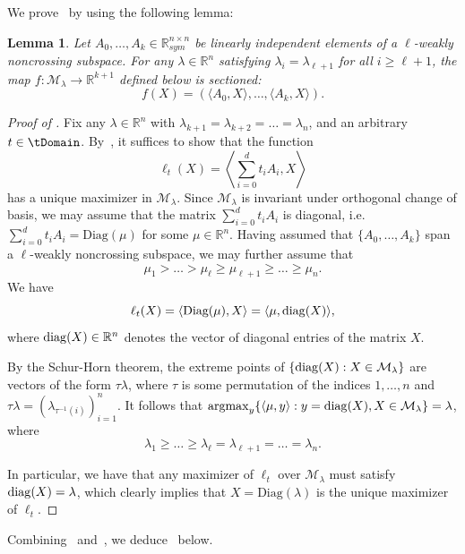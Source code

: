 \documentclass{article}
\numberwithin{equation}{section}
\newcommand{\diag}{{\rm diag}}
\newcommand{\R}{\mathbb{R}}
\newcommand{\Diag}{\text{Diag}}
\newcommand{\argmax}{\operatornamewithlimits{argmax}}
\newtheorem{lemma}{Lemma}[section]
\newcommand{\cM}{{\mathcal{M}}}
\begin{document}
We prove~ by using the following lemma: 
\begin{lemma}
    \label{lem:noncrossing}
    Let $A_0, \dots, A_k \in \R^{n\times n}_{sym}$ be linearly independent elements of a $\ell$-weakly noncrossing subspace. For any $\lambda \in \R^n$ satisfying $\lambda_i = \lambda_{\ell+1}$ for all $i \ge \ell+1$, the map $f:\cM_{\lambda} \rightarrow \R^{k+1}$ defined below is sectioned: 
    \[
        f(X) = (\langle A_0, X\rangle, \dots, \langle A_k, X\rangle).
    \]
\end{lemma}
\begin{proof}[Proof of ]
\newcommand{\At}{A(t)}
Fix any $\lambda \in \R^n$ with $\lambda_{k+1} = \lambda_{k+2} = \dots = \lambda_n$, and an arbitrary $t \in \tDomain $.
By~, it suffices to show that the function 
\[
    \ell_t(X) 
    = \left\langle\sum_{i=0}^{d} t_iA_i, X\right\rangle
\]
has a unique maximizer in $\cM_{\lambda}$.
Since $\cM_{\lambda}$ is invariant under orthogonal change of basis, we may assume that the matrix $\sum_{i=0}^{d} t_iA_i$ is diagonal, i.e. $\sum_{i=0}^{d} t_iA_i = \Diag(\mu)$ for some $\mu \in \R^n$. Having assumed that $\{A_0, \dots, A_k\}$ span a $\ell$-weakly noncrossing subspace, we may further assume that 
\[
\mu_{1} > \dots > \mu_{\ell} \ge \mu_{\ell+1} \ge \dots \ge \mu_n.
\]
We have
\[
    \ell_t(X) 
    = \langle\Diag(\mu), X\rangle
    = \langle\mu,  \diag(X)\rangle,
\]
where $\diag(X) \in \R^n$ denotes the vector of diagonal entries of the matrix $X$.

By the Schur-Horn theorem, the extreme points of $\{ \diag(X) : X \in \cM_{\lambda}\}$ are vectors of the form $\tau \lambda$, where $\tau $ is some permutation of the indices $1,\ldots , n$ and $\tau \lambda = (\lambda_{\tau^{-1}(i)})_{i=1}^n$. It follows that $\argmax_y \{\langle\mu, y\rangle  : y = \diag(X), X \in \cM_{\lambda}\} = \lambda$, where 
\[
    \lambda_1  \ge \dots \ge \lambda_{\ell} = \lambda_{\ell+1} = \dots = \lambda_n.
\]

In particular, we have that any maximizer of $\ell_t$ over $\cM_{\lambda}$ must satisfy $\diag(X) = \lambda$, which clearly implies that $X = \Diag(\lambda)$ is the unique maximizer of $\ell_t$.
\end{proof}

Combining~ and~, we deduce~ below.
\end{document}

